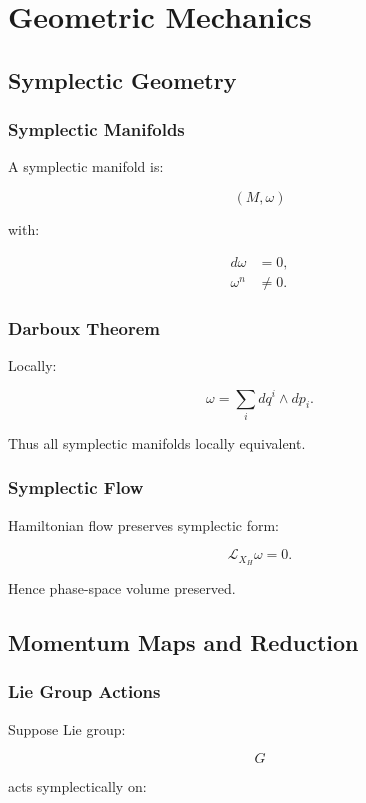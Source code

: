 \documentclass[11pt]{book}
\begin{document}
\part{Geometric Mechanics}

\chapter{Symplectic Geometry}

\section{Symplectic Manifolds}

A symplectic manifold is:

\[
(M,\omega)
\]

with:

\begin{align}
d\omega &=0,\\
\omega^n &\neq 0.
\end{align}

\section{Darboux Theorem}

Locally:

\[
\omega
=
\sum_i dq^i\wedge dp_i.
\]

Thus all symplectic manifolds locally equivalent.

\section{Symplectic Flow}

Hamiltonian flow preserves symplectic form:

\[
\mathcal L_{X_H}\omega=0.
\]

Hence phase-space volume preserved.

\chapter{Momentum Maps and Reduction}

\section{Lie Group Actions}

Suppose Lie group:

\[
G
\]

acts symplectically on:
\end{document}
